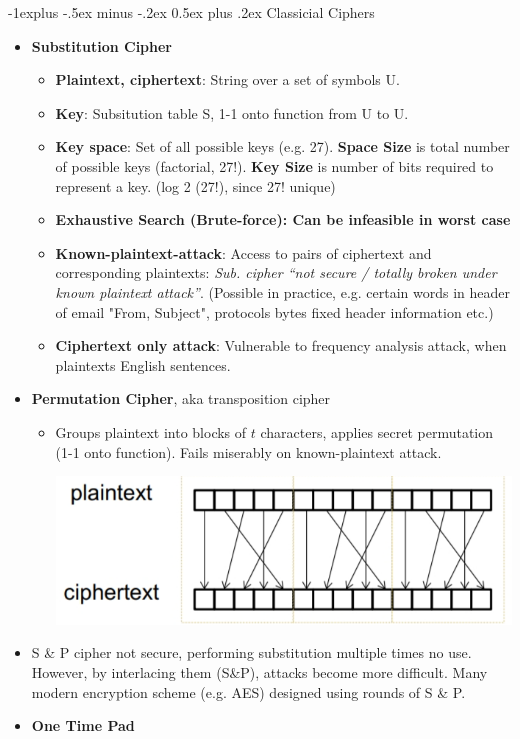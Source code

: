 \documentclass[10pt, landscape]{article}
\makeatletter
\renewcommand{\subsection}{\@startsection{subsection}{2}{0mm}%
                                {-1explus -.5ex minus -.2ex}%
                                {0.5ex plus .2ex}%
                                {\normalfont\normalsize\bfseries}}
\makeatother
\begin{document}
\begin{multicols*}{3}
\subsection{Classicial Ciphers}
\begin{itemize}
\item \textbf{Substitution Cipher} 
	\begin{itemize}
	\item \textbf{Plaintext, ciphertext}: String over a set of symbols U.
	\item \textbf{Key}: Subsitution table S, 1-1 onto function from U to U.
	\item \textbf{Key space}: Set of all possible keys (e.g. 27). \textbf{Space Size} is total number of possible keys (factorial, 27!). \textbf{Key Size} is number of bits required to represent a key. (log 2 (27!), since 27! unique) 
	\item \textbf{Exhaustive Search (Brute-force): Can be infeasible in worst case}
	\item \textbf{Known-plaintext-attack}: Access to pairs of ciphertext and corresponding plaintexts: \textit{Sub. cipher “not secure / totally broken under known plaintext attack”}. (Possible in practice, e.g. certain words in header of email "From, Subject", protocols bytes fixed header information etc.)
	\item \textbf{Ciphertext only attack}: Vulnerable to frequency analysis attack, when plaintexts English sentences.
	\end{itemize}
\item \textbf{Permutation Cipher}, aka transposition cipher
	\begin{itemize}
	\item Groups plaintext into blocks of $t$ characters, applies secret permutation (1-1 onto function). Fails miserably on known-plaintext attack.
	\centerline{\includegraphics[width=0.4\linewidth]{permutationCipher}}
	\end{itemize}
\item S \& P cipher not secure, performing substitution multiple times no use. However, by interlacing them (S\&P), attacks become more difficult. Many modern encryption scheme (e.g. AES) designed using rounds of S \& P.
\item \textbf{One Time Pad}


\end{itemize}























\end{multicols*}
\end{document}
